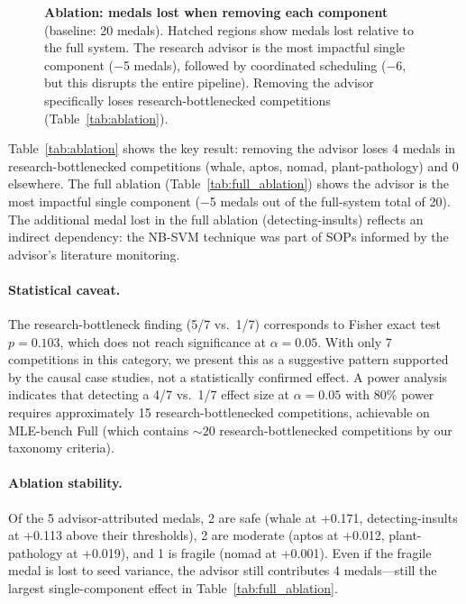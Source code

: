 \documentclass{article}
\begin{document}
\begin{figure}[t]
    \caption{\textbf{Ablation: medals lost when removing each component} (baseline: 20 medals). Hatched regions show medals lost relative to the full system. The research advisor is the most impactful single component ($-$5 medals), followed by coordinated scheduling ($-$6, but this disrupts the entire pipeline). Removing the advisor specifically loses research-bottlenecked competitions (Table~\ref{tab:ablation}).}
    \label{fig:ablation}
\end{figure}

Table~\ref{tab:ablation} shows the key result: removing the advisor loses 4 medals in research-bottlenecked competitions (whale, aptos, nomad, plant-pathology) and 0 elsewhere. The full ablation (Table~\ref{tab:full_ablation}) shows the advisor is the most impactful single component ($-$5 medals out of the full-system total of 20). The additional medal lost in the full ablation (detecting-insults) reflects an indirect dependency: the NB-SVM technique was part of SOPs informed by the advisor's literature monitoring.

\paragraph{Statistical caveat.} The research-bottleneck finding (5/7 vs.\ 1/7) corresponds to Fisher exact test $p = 0.103$, which does not reach significance at $\alpha = 0.05$. With only 7 competitions in this category, we present this as a suggestive pattern supported by the causal case studies, not a statistically confirmed effect. A power analysis indicates that detecting a 4/7 vs.\ 1/7 effect size at $\alpha = 0.05$ with 80\% power requires approximately 15 research-bottlenecked competitions, achievable on MLE-bench Full (which contains $\sim$20 research-bottlenecked competitions by our taxonomy criteria).

\paragraph{Ablation stability.} Of the 5 advisor-attributed medals, 2 are safe (whale at +0.171, detecting-insults at +0.113 above their thresholds), 2 are moderate (aptos at +0.012, plant-pathology at +0.019), and 1 is fragile (nomad at +0.001). Even if the fragile medal is lost to seed variance, the advisor still contributes 4 medals---still the largest single-component effect in Table~\ref{tab:full_ablation}.
\end{document}
